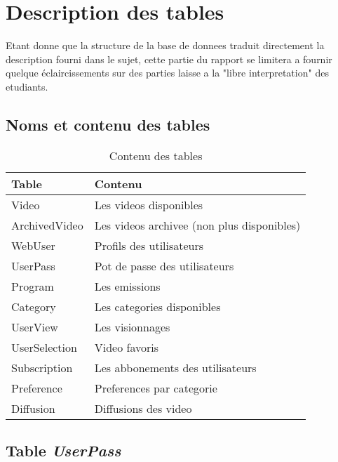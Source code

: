\documentclass[twoside,openright,a4paper,11pt,french]{article}
\begin{document}
\section{Description des tables}
Etant donne que la structure de la base de donnees traduit directement la
description fourni dans le sujet, cette partie du rapport se limitera a fournir
quelque éclaircissements sur des parties laisse a la "libre interpretation" des
etudiants.

\newpage
\subsection{Noms et contenu des tables}
\begin{table}[h]
  \centering
  \begin{tabular}{| p{5cm} | l |}
    \hline
    \textbf{Table} & \textbf{Contenu} \\
    \hline
    Video & Les videos disponibles\\
    \hline
    ArchivedVideo  & Les videos archivee (non plus disponibles)\\
    \hline
    WebUser & Profils des utilisateurs \\
    \hline
    UserPass & Pot de passe des utilisateurs \\
    \hline
    Program & Les emissions \\
    \hline
    Category & Les categories disponibles \\
    \hline
    UserView & Les visionnages \\
    \hline
    UserSelection & Video favoris \\
    \hline
    Subscription & Les abbonements des utilisateurs \\
    \hline
    Preference & Preferences par categorie \\
    \hline
    Diffusion & Diffusions des video \\
    \hline
  \end{tabular}
  \caption{Contenu des tables}
  \label{tab:tables}
\end{table}


\subsection{Table {\it UserPass}}
\end{document}
